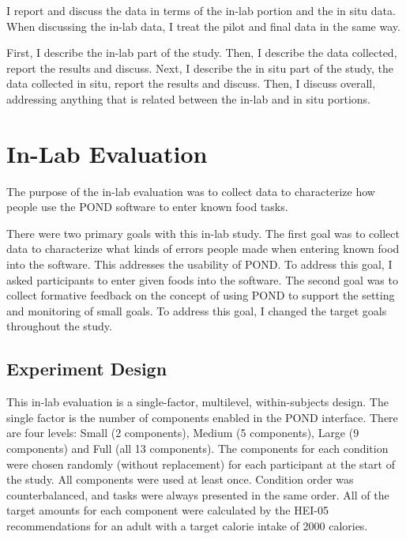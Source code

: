 I report and discuss the data in terms of the in-lab portion and the in situ data. When discussing the in-lab data, I treat the pilot and final data in the same way. 

First, I describe the in-lab part of the study. Then, I describe the data collected, report the results and discuss. Next, I describe the in situ part of the study, the data collected in situ, report the results and discuss. Then, I discuss overall, addressing anything that is related between the in-lab and in situ portions. 

\section{In-Lab Evaluation}
\label{sec:inlabEval}
The purpose of the in-lab evaluation was to collect data to characterize how people use the POND software to enter known food tasks. 

There were two primary goals with this in-lab study. The first goal was  to collect data to characterize what kinds of errors people made when entering known food into the software. This addresses the usability of POND. To address this goal, I asked participants to enter given foods into the software. The second goal was to collect formative feedback on the concept of using POND to support the setting and monitoring of small goals. To address this goal, I changed the target goals throughout the study. 

\subsection{Experiment Design}
This in-lab evaluation is a single-factor, multilevel, within-subjects design. The single factor is the number of components enabled in the POND interface. There are four levels: Small (2 components), Medium (5 components), Large (9 components) and Full (all 13 components). The components for each condition were chosen randomly (without replacement) for each participant at the start of the study. All components were used at least once. Condition order was counterbalanced, and tasks were always presented in the same order. All of the target amounts for each component were calculated by the HEI-05 recommendations for an adult with a target calorie intake of 2000 calories. 

